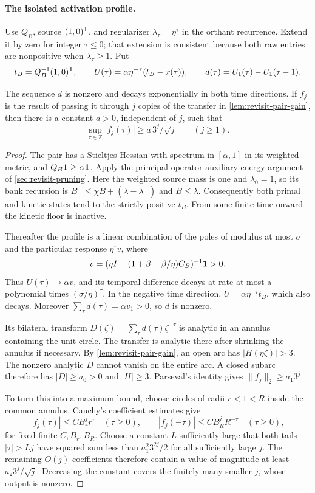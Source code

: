\paragraph{The isolated activation profile.}
Use $Q_B$, source $(1,0)^{\mathsf{T}}$, and regularizer $\lambda_\tau=\eta^\tau$
in the orthant recurrence. Extend it by zero for integer $\tau\leq0$;
that extension is consistent because both raw entries are nonpositive
when $\lambda_\tau\geq1$. Put
\[
 t_B=Q_B^{-1}(1,0)^{\mathsf{T}},\qquad
 U(\tau)=\alpha\eta^{-\tau}(t_B-x(\tau)),\qquad
 d(\tau)=U_1(\tau)-U_1(\tau-1).
\]

\begin{lemma}
\label{lem:revisit-front-signal}
The sequence $d$ is nonzero and decays exponentially in both time
directions. If $f_j$ is the result of passing it through $j$ copies of
the transfer in \cref{lem:revisit-pair-gain}, then there is a constant
$a>0$, independent of $j$, such that
\[
 \sup_{\tau\in\mathbb Z}|f_j(\tau)|\geq a\,3^j/\sqrt j
 \qquad(j\geq1).
\]
\end{lemma}
\begin{proof}
The pair has a Stieltjes Hessian with spectrum in $[\alpha,1]$ in its
weighted metric, and $Q_B\mathbf{1}\geq\alpha\mathbf{1}$.
Apply the principal-operator auxiliary energy argument of
\cref{sec:revisit-pruning}. Here the weighted source mass is one and
$\lambda_0=1$, so its bank recursion is
$B^+\leq\chi B+(\lambda-\lambda^+)$ and $B\leq\lambda$.
Consequently both primal and kinetic states tend to the strictly positive
$t_B$. From some finite time onward the kinetic floor is inactive.

Thereafter the profile is a linear combination of the poles of modulus
at most $\sigma$ and the particular response $\eta^\tau v$, where
\[
 v=(\eta I-(1+\beta-\beta/\eta)C_B)^{-1}\mathbf{1}>0.
\]
Thus $U(\tau)\to\alpha v$, and its temporal difference decays at rate
at most a polynomial times $(\sigma/\eta)^\tau$. In the negative time
direction, $U=\alpha\eta^{-\tau}t_B$, which also decays. Moreover
$\sum_\tau d(\tau)=\alpha v_1>0$, so $d$ is nonzero.

Its bilateral transform $D(\zeta)=\sum_\tau d(\tau)\zeta^{-\tau}$
is analytic in an annulus containing the unit circle. The transfer is
analytic there after shrinking the annulus if necessary. By
\cref{lem:revisit-pair-gain}, an open arc has $|H(\eta\zeta)|>3$.
The nonzero analytic $D$ cannot vanish on the entire arc. A closed
subarc therefore has $|D|\geq a_0>0$ and $|H|\geq3$.
Parseval's identity gives $\|f_j\|_2\geq a_1 3^j$.

To turn this into a maximum bound, choose circles of radii
$r<1<R$ inside the common annulus. Cauchy's coefficient estimates give
\[
 |f_j(\tau)|\leq C B_r^j r^\tau\quad(\tau\geq0),\qquad
 |f_j(-\tau)|\leq C B_R^j R^{-\tau}\quad(\tau\geq0),
\]
for fixed finite $C,B_r,B_R$. Choose a constant $L$ sufficiently large
that both tails $|\tau|>Lj$ have squared sum less than
$a_1^2 3^{2j}/2$ for all sufficiently large $j$.
The remaining $O(j)$ coefficients therefore contain a value of magnitude
at least $a_2 3^j/\sqrt j$. Decreasing the constant covers the finitely
many smaller $j$, whose output is nonzero.
\end{proof}

